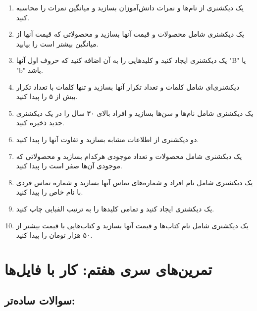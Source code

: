\documentclass[a4paper,12pt]{article}
\begin{document}
	\begin{enumerate}
		\item یک دیکشنری از نام‌ها و نمرات دانش‌آموزان بسازید و میانگین نمرات را محاسبه کنید.
		\item یک دیکشنری شامل محصولات و قیمت آنها بسازید و محصولاتی که قیمت آنها از میانگین بیشتر است را بیابید.
		\item یک دیکشنری ایجاد کنید و کلیدهایی را به آن اضافه کنید که حروف اول آنها "B" یا "b" باشد.
		\item دیکشنری‌ای شامل کلمات و تعداد تکرار آنها بسازید و تنها کلمات با تعداد تکرار بیش از ۵ را پیدا کنید.
		\item یک دیکشنری شامل نام‌ها و سن‌ها بسازید و افراد بالای ۳۰ سال را در یک دیکشنری جدید ذخیره کنید.
		\item دو دیکشنری از اطلاعات مشابه بسازید و تفاوت آنها را پیدا کنید.
		\item یک دیکشنری شامل محصولات و تعداد موجودی هرکدام بسازید و محصولاتی که موجودی آن‌ها صفر است را پیدا کنید.
		\item یک دیکشنری شامل نام افراد و شماره‌های تماس آنها بسازید و شماره تماس فردی با نام خاص را پیدا کنید.
		\item یک دیکشنری ایجاد کنید و تمامی کلیدها را به ترتیب الفبایی چاپ کنید.
		\item یک دیکشنری شامل نام کتاب‌ها و قیمت آنها بسازید و کتاب‌هایی با قیمت بیشتر از ۵۰ هزار تومان را پیدا کنید.
	\end{enumerate}
	
	
	
	\newpage
	\section*{تمرین‌های سری هفتم: کار با فایل‌ها}
	
	\subsection*{سوالات ساده‌تر:}
	
\end{document}
